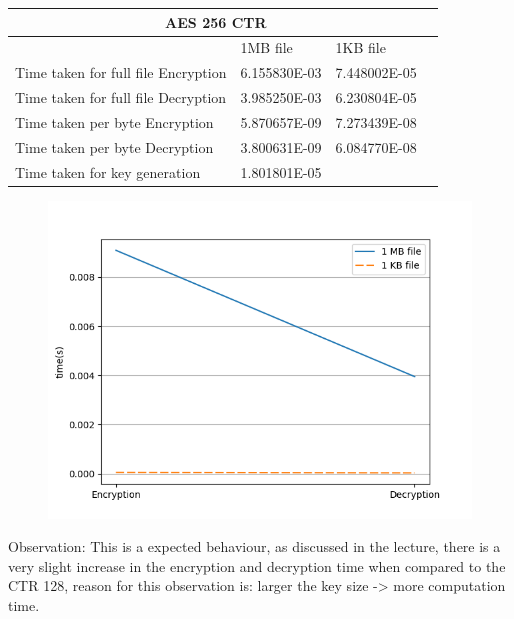 \documentclass[12pt]{article}%
\begin{document}
\begin{tabular}{ |p{8cm}|p{3cm}|p{3cm}|p{3cm} }
 \hline
 \multicolumn{3}{|c|}{AES 256 CTR} \\
 \hline
	 & 1MB file & 1KB file\\
 \hline
 Time taken for full file Encryption   &   6.155830E-03   & 7.448002E-05  \\
  \hline
 Time taken for full file Decryption & 3.985250E-03   & 6.230804E-05	\\
 \hline
 Time taken per byte Encryption   &  5.870657E-09    & 7.273439E-08  \\
  \hline
 Time taken per byte Decryption & 3.800631E-09  & 6.084770E-08	\\
 \hline
 Time taken for key generation & 1.801801E-05   & 	\\
 \hline
\end{tabular}
\begin{figure}[h]
    \centering
	\includegraphics[scale=0.5]{q1c}
\end{figure}

Observation: This is a expected behaviour, as discussed in the lecture, there is a very slight increase in the encryption and decryption time when compared to the CTR 128, reason for this observation is: larger the key size -> more computation time.
\end{document}
